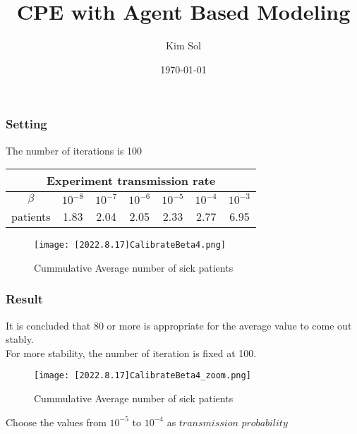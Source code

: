 \documentclass[aspectratio=169, 9pt, xcolor=table]{beamer}
\title{CPE with Agent Based Modeling}
\author{Kim Sol}
\institute{School of Mathematics and Computing}
\date{\today}
\begin{document}
\begin{frame}
    \titlepage
\end{frame}


\begin{frame}
    \frametitle{Setting}
    The number of iterations is 100
    \begin{center}
    \begin{tabular}{|c||c|c|c|c|c|c|}   
        \hline
        \multicolumn{7}{|c|}{Experiment transmission rate} \\
        \hline
        \(\beta\)& \(10^{-8}\) & \(10^{-7}\) & \(10^{-6}\) & \(10^{-5}\) & \(10^{-4}\) & \(10^{-3}\)\\
        \hline
        patients& 1.83  & 2.04 & 2.05 & 2.33 & 2.77 & 6.95\\
        \hline
    \end{tabular}
    \end{center}


    \begin{figure}[H]
        \centering
        \texttt{[image: [2022.8.17]CalibrateBeta4.png]} %
        \caption{Cummulative Average number of sick patients}
    \end{figure}
    
\end{frame}

\begin{frame}
    \frametitle{Result}
    It is concluded that 80 or more is appropriate for the average value to come out stably. \\
    For more stability, the number of iteration is fixed at 100.
    \begin{figure}[H]
        \centering
        \texttt{[image: [2022.8.17]CalibrateBeta4\_zoom.png]} %
        \caption{Cummulative Average number of sick patients}
    \end{figure}
    Choose the values from \(10^{-5}\) to \(10^{-4}\) as $\textit{transmission probability}$
\end{frame}



    
\end{document}
